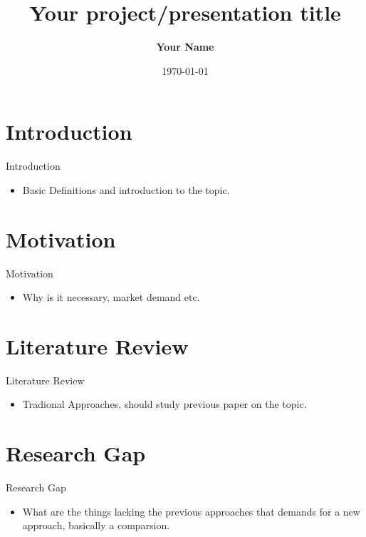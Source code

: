 \documentclass[dvipsnames,mathserif]{beamer}
\begin{document}
\rightskip\rightmargin
\title{Your project/presentation title}
\author{ \Large \textbf{ Your Name} }
\footnotesize{\date{\today }


\begin{frame}
\maketitle
\end{frame}


%
\footnotesize \tableofcontents
%
\section{Introduction}
\begin{frame}{Introduction}
    \begin{itemize}
        \item Basic Definitions and introduction to the topic.
    \end{itemize}
\end{frame}
\section{Motivation}
\begin{frame}{Motivation}
    \begin{itemize}
        \item Why is it necessary, market demand etc.
    \end{itemize}
\end{frame}
\section{Literature Review}
\begin{frame}{Literature Review}
    \begin{itemize}
        \item Tradional Approaches, should study previous paper on the topic.
    \end{itemize}
\end{frame}
\section{Research Gap}
\begin{frame}{Research Gap}
    \begin{itemize}
        \item What are the things lacking the previous approaches that demands for a new approach, basically a comparsion.
    \end{itemize}
\end{frame}
}
\end{document}
